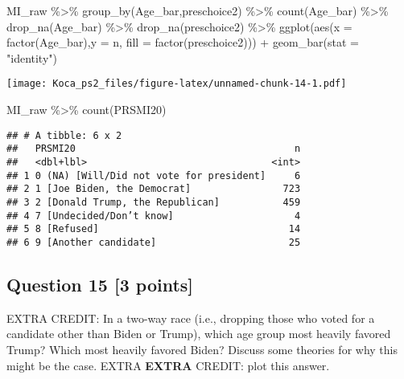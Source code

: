 \documentclass[
]{article}
\newenvironment{Shaded}{\begin{snugshade}}{\end{snugshade}}
\newcommand{\AttributeTok}[1]{\textcolor[rgb]{0.77,0.63,0.00}{#1}}
\newcommand{\FunctionTok}[1]{\textcolor[rgb]{0.00,0.00,0.00}{#1}}
\newcommand{\NormalTok}[1]{#1}
\newcommand{\SpecialCharTok}[1]{\textcolor[rgb]{0.00,0.00,0.00}{#1}}
\newcommand{\StringTok}[1]{\textcolor[rgb]{0.31,0.60,0.02}{#1}}
\begin{document}
\begin{Shaded}
\begin{Highlighting}[]
\NormalTok{MI\_raw }\SpecialCharTok{\%\textgreater{}\%}
  \FunctionTok{group\_by}\NormalTok{(Age\_bar,preschoice2) }\SpecialCharTok{\%\textgreater{}\%}
  \FunctionTok{count}\NormalTok{(Age\_bar) }\SpecialCharTok{\%\textgreater{}\%}
  \FunctionTok{drop\_na}\NormalTok{(Age\_bar) }\SpecialCharTok{\%\textgreater{}\%}
  \FunctionTok{drop\_na}\NormalTok{(preschoice2) }\SpecialCharTok{\%\textgreater{}\%}
  \FunctionTok{ggplot}\NormalTok{(}\FunctionTok{aes}\NormalTok{(}\AttributeTok{x =} \FunctionTok{factor}\NormalTok{(Age\_bar),}\AttributeTok{y =}\NormalTok{ n, }\AttributeTok{fill =} \FunctionTok{factor}\NormalTok{(preschoice2))) }\SpecialCharTok{+}
  \FunctionTok{geom\_bar}\NormalTok{(}\AttributeTok{stat =} \StringTok{"identity"}\NormalTok{)}
\end{Highlighting}
\end{Shaded}

\texttt{[image: Koca\_ps2\_files/figure-latex/unnamed-chunk-14-1.pdf]}

\begin{Shaded}
\begin{Highlighting}[]
\NormalTok{MI\_raw }\SpecialCharTok{\%\textgreater{}\%}
  \FunctionTok{count}\NormalTok{(PRSMI20)}
\end{Highlighting}
\end{Shaded}

\begin{verbatim}
## # A tibble: 6 x 2
##   PRSMI20                                      n
##   <dbl+lbl>                                <int>
## 1 0 (NA) [Will/Did not vote for president]     6
## 2 1 [Joe Biden, the Democrat]                723
## 3 2 [Donald Trump, the Republican]           459
## 4 7 [Undecided/Don’t know]                     4
## 5 8 [Refused]                                 14
## 6 9 [Another candidate]                       25
\end{verbatim}

\hypertarget{question-15-3-points}{%
\subsection{Question 15 {[}3 points{]}}\label{question-15-3-points}}

EXTRA CREDIT: In a two-way race (i.e., dropping those who voted for a
candidate other than Biden or Trump), which age group most heavily
favored Trump? Which most heavily favored Biden? Discuss some theories
for why this might be the case. EXTRA \textbf{EXTRA} CREDIT: plot this
answer.
\end{document}
